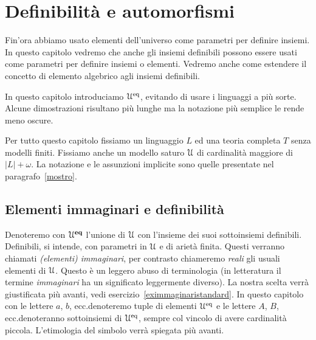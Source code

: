 \chapter{Definibilit\`a e automorfismi}
\label{immaginariA}
\def\b{b\llap{\raisebox{-.8ex}{-\hskip.2ex}}}
\def\a{a\llap{\raisebox{-.8ex}{-\hskip.2ex}}}
\def\d{{\rm def}}

Fin'ora abbiamo usato elementi dell'universo come parametri per definire insiemi. In questo capitolo vedremo che anche gli insiemi definibili possono essere usati come parametri per definire insiemi o elementi. Vedremo anche come estendere il concetto di elemento algebrico agli insiemi definibili.

In questo capitolo introduciamo $\EuScript U^{\rm eq}$, evitando di usare i linguaggi a pi\`u sorte. Alcune dimostrazioni risultano pi\`u lunghe ma la notazione pi\`u semplice le rende meno oscure.  

Per tutto questo capitolo fissiamo un linguaggio $L$ ed una teoria completa $T$ senza modelli finiti. Fissiamo anche un modello saturo $\EuScript U$ di cardinalit\`a maggiore di $|L|+\omega$. La notazione e le assunzioni implicite sono quelle presentate nel paragrafo~\ref{mostro}.





\def\ceq#1#2#3{\parbox{20ex}{\hskip0pt #1}\llap{#2}\parbox{8ex}{\hfil #3}}
\section{Elementi immaginari e definibilit\`a}\label{immaginari}

Denoteremo con \emph{$\EuScript U^{\rm\bf eq}$} l'unione di $\EuScript U$ con l'insieme dei suoi sottoinsiemi definibili. Definibili, si intende, con parametri in $\EuScript U$ e di ariet\`a finita. Questi verranno chiamati \emph{(elementi) immaginari}, per contrasto chiameremo \emph{reali\/} gli usuali elementi di $\EuScript U$. Questo \`e un leggero abuso di terminologia (in letteratura il termine \textit{immaginari\/} ha un significato leggermente diverso). La nostra scelta verr\`a giustificata pi\`u avanti, vedi esercizio~\ref{eximmaginaristandard}. In questo capitolo con le lettere $a$, $b$, ecc.\@ denoteremo tuple di elementi $\EuScript U^{\rm eq}$ e le lettere $A$, $B$, ecc.\@ denoteranno sottoinsiemi di $\EuScript U^{\rm eq}$, sempre col vincolo di avere cardinalit\`a piccola. L'etimologia del simbolo verr\`a spiegata pi\`u avanti.


